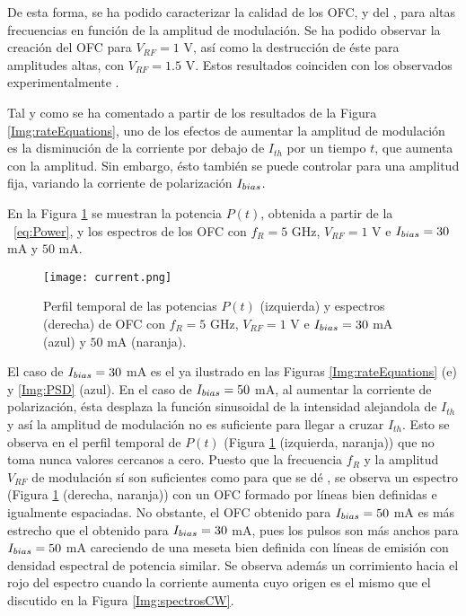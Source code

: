 		De esta forma, se ha podido caracterizar la calidad de los OFC, y del \gs, para altas frecuencias en función de la amplitud de modulaci\'on. Se ha podido observar la creaci\'on del OFC para $V_{RF} = 1$ V, as\'i como la destrucci\'on de éste para amplitudes altas, con $V_{RF} = 1.5$ V. Estos resultados coinciden con los observados experimentalmente \cite{artSim}.

		Tal y como se ha comentado a partir de los resultados de la Figura \ref{Img:rateEquations}, uno de los efectos de aumentar la amplitud de modulaci\'on es la disminuci\'on de la corriente por debajo de $I_{th}$ por un tiempo $t$, que aumenta con la amplitud. Sin embargo, \'esto también se puede controlar para una amplitud fija, variando la corriente de polarizaci\'on $I_{bias}$.

		En la Figura \ref{Img:current} se muestran la potencia $P(t)$, obtenida a partir de la \s\ \ref{eq:Power}, y los espectros de los OFC con $f_R = 5$ GHz, $V_{RF} = 1$ V e $I_{bias} = 30$ mA y $50$ mA.

			\begin{figure}[H]
				\centering
				\texttt{[image: current.png]}
				\caption{\label{Img:current}Perfil temporal de las potencias $P(t)$ (izquierda) y espectros (derecha) de OFC con $f_R = 5$ GHz, $V_{RF} = 1$ V e $I_{bias} = 30$ mA (azul) y $50$ mA (naranja).}	
			\end{figure}

		El caso de $I_{bias} = 30$ mA es el ya ilustrado en las Figuras \ref{Img:rateEquations} (e) y \ref{Img:PSD} (azul). En el caso de $I_{bias} = 50$ mA, al aumentar la corriente de polarizaci\'on, \'esta desplaza la función sinusoidal de la intensidad alejandola de $I_{th}$ y as\'i la amplitud de modulaci\'on no es suficiente para llegar a cruzar $I_{th}$. Esto se observa en el perfil temporal de $P(t)$ (Figura \ref{Img:current} (izquierda, naranja)) que no toma nunca valores cercanos a cero. Puesto que la frecuencia $f_R$ y la amplitud $V_{RF}$ de modulación s\'i son suficientes como para que se d\'e \gs, se observa un espectro (Figura \ref{Img:current} (derecha, naranja)) con un OFC formado por l\'ineas bien definidas e igualmente espaciadas. No obstante, el OFC obtenido para $I_{bias} = 50$ mA es m\'as estrecho que el obtenido para $I_{bias} = 30$ mA, pues los pulsos son más anchos para $I_{bias} = 50$ mA careciendo de una meseta bien definida con l\'ineas de emisi\'on con densidad espectral de potencia similar. Se observa además un corrimiento hacia el rojo del espectro cuando la corriente aumenta cuyo origen es el mismo que el discutido en la Figura \ref{Img:spectrosCW}.

